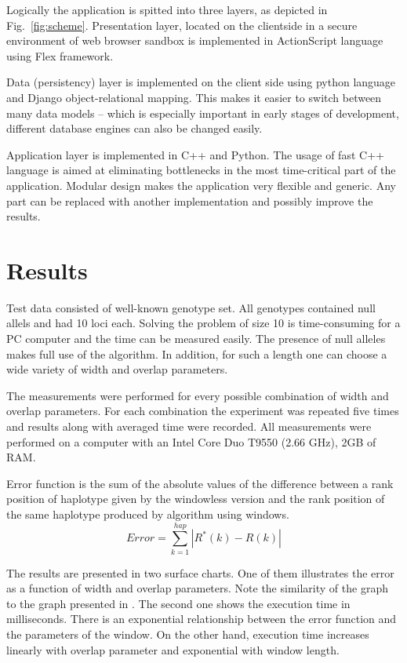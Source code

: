 \documentclass[]{spie}
\begin{document}
Logically the application is spitted into three layers, as depicted in Fig.~\ref{fig:scheme}.
Presentation layer, located on the clientside in a secure environment of web browser sandbox is implemented in ActionScript language using Flex framework.

Data (persistency) layer is implemented on the client side using python language and Django object-relational mapping.
This makes it easier to switch between many data models -- which is especially important in early stages of development,
different database engines can also be changed easily.

Application layer is implemented in C++ and Python.
The usage of fast C++ language is aimed at eliminating bottlenecks in the most time-critical part of the application.
Modular design makes the application very flexible and generic.
Any part can be replaced with another implementation and possibly improve the results.

\section{Results}

Test data consisted of well-known genotype set.
All genotypes contained null allels and had 10 loci each.
Solving the problem of size 10 is time-consuming for a PC computer and the time can be measured easily.
The presence of null alleles makes full use of the algorithm.
In addition, for such a length one can choose a wide variety of width and overlap parameters.

The measurements were performed for every possible combination of width and overlap parameters.
For each combination the experiment was repeated five times and results along with averaged time were recorded.
All measurements were performed on a computer with an Intel Core Duo T9550 (2.66 GHz), 2GB of RAM.

Error function is the sum of the absolute values of the difference between a rank position of haplotype given by the windowless version and the rank position of the same haplotype produced by algorithm using windows.
$$ Error = \sum_{k=1}^{hap} |R^{*}(k) - R(k)|$$

The results are presented in two surface charts.
One of them illustrates the error as a function of width and overlap parameters.
Note the similarity of the graph to the graph presented in \cite{gusev}.
The second one shows the execution time in milliseconds.
There is an exponential relationship between the error function and the parameters of the window.
On the other hand, execution time increases linearly with overlap parameter and exponential with window length.
\end{document}
